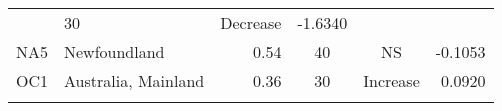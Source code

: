 \documentclass[]{article}
\begin{document}
\begin{longtable}[]{@{}clrccr@{}}
\begin{minipage}[t]{0.11\columnwidth}
\strut
\end{minipage} & \begin{minipage}[t]{0.10\columnwidth}\centering\strut
30\strut
\end{minipage} & \begin{minipage}[t]{0.16\columnwidth}\centering\strut
Decrease\strut
\end{minipage} & \begin{minipage}[t]{0.09\columnwidth}\raggedleft\strut
-1.6340\strut
\end{minipage}\tabularnewline
\begin{minipage}[t]{0.08\columnwidth}\centering\strut
NA5\strut
\end{minipage} & \begin{minipage}[t]{0.29\columnwidth}\raggedright\strut
Newfoundland\strut
\end{minipage} & \begin{minipage}[t]{0.11\columnwidth}\raggedleft\strut
0.54\strut
\end{minipage} & \begin{minipage}[t]{0.10\columnwidth}\centering\strut
40\strut
\end{minipage} & \begin{minipage}[t]{0.16\columnwidth}\centering\strut
NS\strut
\end{minipage} & \begin{minipage}[t]{0.09\columnwidth}\raggedleft\strut
-0.1053\strut
\end{minipage}\tabularnewline
\begin{minipage}[t]{0.08\columnwidth}\centering\strut
OC1\strut
\end{minipage} & \begin{minipage}[t]{0.29\columnwidth}\raggedright\strut
Australia, Mainland\strut
\end{minipage} & \begin{minipage}[t]{0.11\columnwidth}\raggedleft\strut
0.36\strut
\end{minipage} & \begin{minipage}[t]{0.10\columnwidth}\centering\strut
30\strut
\end{minipage} & \begin{minipage}[t]{0.16\columnwidth}\centering\strut
Increase\strut
\end{minipage} & \begin{minipage}[t]{0.09\columnwidth}\raggedleft\strut
0.0920\strut
\end{minipage}\tabularnewline
\begin{minipage}[t]{0.08\columnwidth}\centering\strut

\end{minipage}
\end{longtable}
\end{document}
